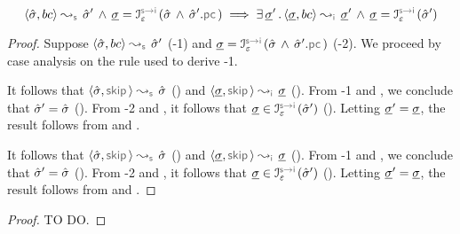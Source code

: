 \begin{lemma}
$$
\absbsemrule{\sstate, \bcmd}{\sstate'}{\symbolic} \, \wedge \, \istate = \interpret{\symbinst}{\senv}(\sstate \, \wedge \, \sstate'.\pcsel)
     \implies 
        \exists \, \istate' \, . \, \absbsemrule{\istate, \bcmd}{\istate'}{\instrumented} \, \wedge \, 
            \istate = \interpret{\symbinst}{\senv}(\sstate')
$$
\end{lemma}
\begin{proof}
Suppose $\absbsemrule{\sstate, \bcmd}{\sstate'}{\symbolic}$ (\hyp{1}) and 
$\istate = \interpret{\symbinst}{\senv}(\sstate \, \wedge \, \sstate'.\pcsel)$ (\hyp{2}).
We proceed by case analysis on the rule used to derive \hyp{1}. 
\vspace{3pt}


\noindent {} It follows that $\absbsemrule{\sstate, \jsilskip}{\sstate}{\symbolic}$ () and 
$\absbsemrule{\istate, \jsilskip}{\istate}{\instrumented}$ (). 
From \hyp{1} and , we conclude that $\hat{\sigma}' = \hat{\sigma}$ (). 
From \hyp{2} and , it follows that $\istate \in \interpret{\symbinst}{\senv}(\sstate')$ (). 
Letting $\underline{\sigma}' = \underline{\sigma}$, the result follows from  and . 
\vspace{5pt}


\noindent {} It follows that $\absbsemrule{\sstate, \jsilskip}{\sstate}{\symbolic}$ () and 
$\absbsemrule{\istate, \jsilskip}{\istate}{\instrumented}$ (). 
From \hyp{1} and , we conclude that $\hat{\sigma}' = \hat{\sigma}$ (). 
From \hyp{2} and , it follows that $\istate \in \interpret{\symbinst}{\senv}(\sstate')$ (). 
Letting $\underline{\sigma}' = \underline{\sigma}$, the result follows from  and . 
\vspace{5pt}

\end{proof}

%


\begin{temax}

\end{temax}
\begin{proof}
TO DO. 
\end{proof}

